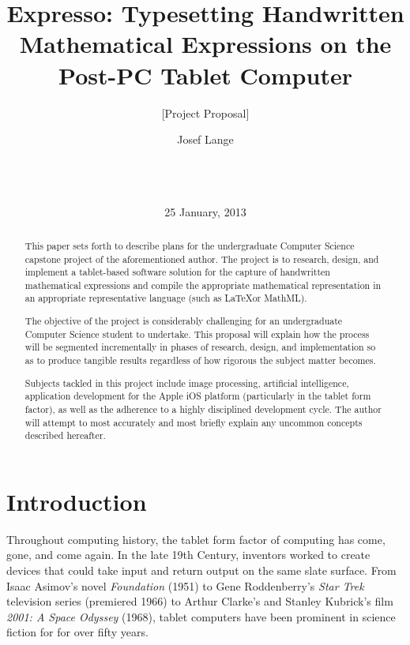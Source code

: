 \documentclass{acm_proc_article-sp}
\begin{document}
\title{ Expresso: Typesetting Handwritten Mathematical Expressions on the Post-PC Tablet Computer }
\subtitle{[Project Proposal]}


\author{
\alignauthor
Josef Lange\\
       \\
       \\
       \\
       }
       
\date{25 January, 2013}

\maketitle

\begin{abstract}
This paper sets forth to describe plans for the undergraduate Computer Science capstone project of the aforementioned author. The project is to research, design, and implement a tablet-based software solution for the capture of handwritten mathematical expressions and compile the appropriate mathematical representation in an appropriate representative language (such as \LaTeX or MathML).

The objective of the project is considerably challenging for an undergraduate Computer Science student to undertake. This proposal will explain how the process will be segmented incrementally in phases of research, design, and implementation so as to produce tangible results regardless of how rigorous the subject matter becomes.

Subjects tackled in this project include image processing, artificial intelligence, application development for the Apple iOS platform (particularly in the tablet form factor), as well as the adherence to a highly disciplined development cycle. The author will attempt to most accurately and most briefly explain any uncommon concepts described hereafter.
\end{abstract}

\section{Introduction}
Throughout computing history, the tablet form factor of computing has come, gone, and come again. In the late 19th Century, inventors worked to create devices that could take input and return output on the same slate surface. From Isaac Asimov's novel \emph{Foundation} (1951) to Gene Roddenberry's \emph{Star Trek} television series (premiered 1966) to Arthur Clarke's and Stanley Kubrick's film \emph{2001: A Space Odyssey} (1968), tablet computers have been prominent in science fiction for for over fifty years.
\end{document}
